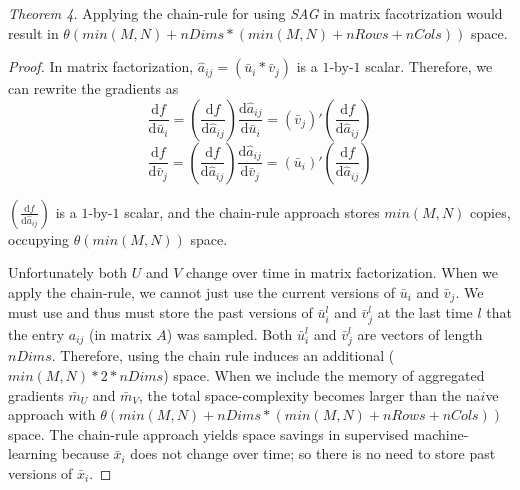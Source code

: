 \emph{Theorem 4.} 
Applying the chain-rule for using \emph{SAG} in matrix facotrization would result in $\theta(min(M,N) + nDims*(min(M,N)+nRows+nCols))$ space.
\begin{proof}
In matrix factorization, $\hat{a}_{ij} = \left(\bar{u}_{i}*\bar{v}_{j}\right)$ is a $1$-by-$1$ scalar.  
Therefore, we can rewrite the gradients as
\begin{equation}
\frac{\text{d}{f}}{\text{d}\bar{u}_{i}} = \left(\frac{\text{d}{f}}{\text{d}\hat{a}_{ij}}\right)\frac{\text{d}{\hat{a}_{ij}}}{\text{d}\bar{u}_{i}} = \left(\bar{v}_{j}\right)'\left(\frac{\text{d}{f}}{\text{d}\hat{a}_{ij}}\right)
\end{equation}
\begin{equation}
\frac{\text{d}{f}}{\text{d}\bar{v}_{j}} = \left(\frac{\text{d}{f}}{\text{d}\hat{a}_{ij}}\right)\frac{\text{d}{\hat{a}_{ij}}}{\text{d}\bar{v}_{j}} = \left(\bar{u}_{i}\right)'\left(\frac{\text{d}{f}}{\text{d}\hat{a}_{ij}}\right)
\end{equation}

$\left(\frac{\text{d}{f}}{\text{d}\hat{a}_{ij}}\right)$ is a $1$-by-$1$ scalar, and the chain-rule approach stores $min(M,N)$ copies, occupying $\theta(min(M,N))$ space.

Unfortunately both $U$ and $V$ change over time in matrix factorization.
When we apply the chain-rule, we cannot just use the current versions of $\bar{u}_{i}$ and $\bar{v}_{j}$.
We must use and thus must store the past versions of $\bar{u}_{i}^{l}$ and $\bar{v}_{j}^{l}$ at the last time $l$ that the entry $a_{ij}$ (in matrix $A$) was sampled.
Both $\bar{u}_{i}^{l}$ and $\bar{v}_{j}^{l}$ are vectors of length $nDims$.
Therefore, using the chain rule induces an additional ($min(M,N)*2*nDims$) space.
When we include the memory of aggregated gradients $\bar{m}_{U}$ and $\bar{m}_{V}$, the total space-complexity becomes larger than the na$\ddot{i}$ve approach with $\theta(min(M,N) + nDims*(min(M,N)+nRows+nCols))$ space.
The chain-rule approach yields space savings in supervised machine-learning because $\bar{x}_{i}$ does not change over time; 
so there is no need to store past versions of $\bar{x}_{i}$.
\end{proof}
